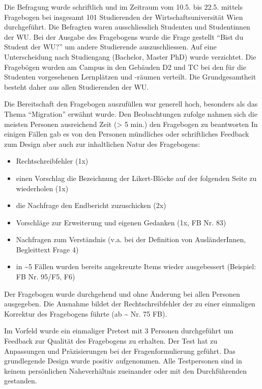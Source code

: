 \documentclass[]{article}
\providecommand{\tightlist}{%
  \setlength{\itemsep}{0pt}\setlength{\parskip}{0pt}}
\begin{document}
Die Befragung wurde schriftlich und im Zeitraum vom 10.5. bis 22.5.
mittels Fragebogen bei insgesamt 101 Studierenden der
Wirtschaftsuniversität Wien durchgeführt. Die Befragten waren
ausschliesslich Studenten und Studentinnen der WU. Bei der Ausgabe des
Fragebogens wurde die Frage gestellt ``Bist du Student der WU?'' um
andere Studierende auszuschliessen. Auf eine Unterscheidung nach
Studiengang (Bachelor, Master PhD) wurde verzichtet. Die Fragebögen
wurden am Campus in den Gebäuden D2 und TC bei den für die Studenten
vorgesehenen Lernplätzen und -räumen verteilt. Die Grundgesamtheit
besteht daher aus allen Studierenden der WU.

Die Bereitschaft den Fragebogen auszufüllen war generell hoch, besonders
als das Thema ``Migration'' erwähnt wurde. Den Beobachtungen zufolge
nahmen sich die meisten Personen ausreichend Zeit (\textgreater{} 5
min.) den Fragebogen zu beantworten In einigen Fällen gab es von den
Personen mündliches oder schriftliches Feedback zum Design aber auch zur
inhaltlichen Natur des Fragebogens:

\begin{itemize}
\tightlist
\item
  Rechtschreibfehler (1x)
\item
  einen Vorschlag die Bezeichnung der Likert-Blöcke auf der folgenden
  Seite zu wiederholen (1x)
\item
  die Nachfrage den Endbericht zuzuschicken (2x)
\item
  Vorschläge zur Erweiterung und eigenen Gedanken (1x, FB Nr. 83)
\item
  Nachfragen zum Verständnis (v.a. bei der Definition von
  AusländerInnen, Begleittext Frage 4)
\item
  in \textasciitilde{}5 Fällen wurden bereits angekreuzte Items wieder
  ausgebessert (Beispiel: FB Nr. 95/F5, F6)
\end{itemize}

Der Fragebogen wurde durchgehend und ohne Änderung bei allen Personen
ausgegeben. Die Ausnahme bildet der Rechtschreibfehler der zu einer
einmaligen Korrektur des Fragebogens führte (ab \textasciitilde{} Nr. 75
FB).

Im Vorfeld wurde ein einmaliger Pretest mit 3 Personen durchgeführt um
Feedback zur Qualität des Fragebogens zu erhalten. Der Test hat zu
Anpassungen und Präzisierungen bei der Fragenformulierung geführt. Das
grundlegende Design wurde positiv aufgenommen. Alle Testpersonen sind in
keinem persönlichen Naheverhältnis zueinander oder mit den
Durchführenden gestanden.
\end{document}
